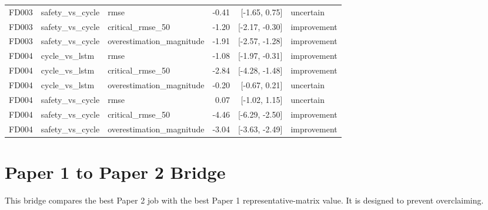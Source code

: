 \documentclass[10pt]{article}
\begin{document}
\begin{longtable}{lllrrl}
FD003 & safety\_vs\_cycle & rmse & -0.41 & [-1.65, 0.75] & uncertain \\
FD003 & safety\_vs\_cycle & critical\_rmse\_50 & -1.20 & [-2.17, -0.30] & improvement \\
FD003 & safety\_vs\_cycle & overestimation\_magnitude & -1.91 & [-2.57, -1.28] & improvement \\
FD004 & cycle\_vs\_lstm & rmse & -1.08 & [-1.97, -0.31] & improvement \\
FD004 & cycle\_vs\_lstm & critical\_rmse\_50 & -2.84 & [-4.28, -1.48] & improvement \\
FD004 & cycle\_vs\_lstm & overestimation\_magnitude & -0.20 & [-0.67, 0.21] & uncertain \\
FD004 & safety\_vs\_cycle & rmse & 0.07 & [-1.02, 1.15] & uncertain \\
FD004 & safety\_vs\_cycle & critical\_rmse\_50 & -4.46 & [-6.29, -2.50] & improvement \\
FD004 & safety\_vs\_cycle & overestimation\_magnitude & -3.04 & [-3.63, -2.49] & improvement \\
\bottomrule
\end{longtable}
\normalsize

\section{Paper 1 to Paper 2 Bridge}
This bridge compares the best Paper 2 job with the best Paper 1 representative-matrix value. It is designed to prevent overclaiming.
\end{document}
